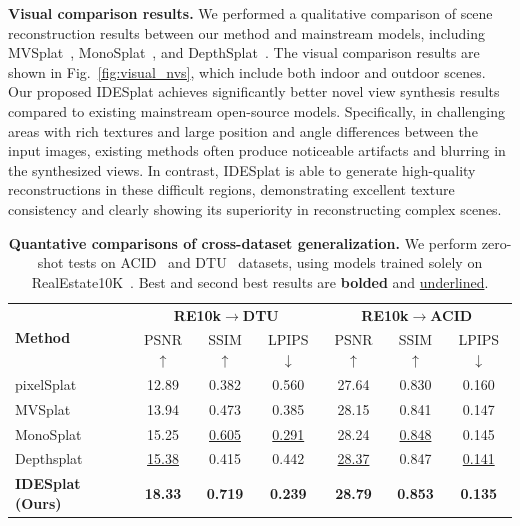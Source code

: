 %
\noindent\textbf{Visual comparison results.}
%
We performed a qualitative comparison of scene reconstruction results between our method and mainstream models, including MVSplat~\cite{chen2024mvsplat}, MonoSplat~\cite{liu2025monosplat}, and DepthSplat~\cite{xu2025depthsplat}. The visual comparison results are shown in Fig.~\ref{fig:visual_nvs}, which include both indoor and outdoor scenes.
Our proposed IDESplat achieves significantly better novel view synthesis results compared to existing mainstream open-source models.
Specifically, in challenging areas with rich textures and large position and angle differences between the input images, existing methods often produce noticeable artifacts and blurring in the synthesized views.
In contrast, IDESplat is able to generate high-quality reconstructions in these difficult regions, demonstrating excellent texture consistency and clearly showing its superiority in reconstructing complex scenes.



\begin{table}
    \footnotesize
    \centering
    \caption{\textbf{Quantative comparisons of cross-dataset generalization.} We perform zero-shot tests on ACID~\cite{liu2021infinite} and DTU~\cite{jensen2014large} datasets, using models trained solely on RealEstate10K~\cite{DBLP:journals/tog/ZhouTFFS18}. Best and second best results are \textbf{bolded} and \underline{underlined}.}
    \vspace{-2mm}
    \setlength{\tabcolsep}{2.5pt} %
    \begin{tabular}{l|ccc|ccc}
        \toprule
        \multirow{2}{*}{\textbf{Method}} & \multicolumn{3}{c|}{\textbf{RE10k$\rightarrow$DTU}} & \multicolumn{3}{c}{\textbf{RE10k$\rightarrow$ACID}}\\
        & PSNR$\uparrow$ & SSIM$\uparrow$ & LPIPS$\downarrow$  & PSNR$\uparrow$ & SSIM$\uparrow$ & LPIPS$\downarrow$ \\
        \midrule
        pixelSplat~\cite{charatan2024pixelsplat} & 12.89             & 0.382             & 0.560 & 27.64 & 0.830 & 0.160 \\
        MVSplat~\cite{chen2024mvsplat}           & 13.94             & 0.473             & 0.385 & 28.15 & 0.841 & 0.147 \\
        MonoSplat~\cite{liu2025monosplat}        & 15.25             & \underline{0.605} & \underline{0.291} & 28.24 & \underline{0.848} & 0.145 \\
        Depthsplat~\cite{xu2025depthsplat}       & \underline{15.38} & 0.415             & 0.442 & \underline{28.37} & 0.847 & \underline{0.141} \\
        \rowcolor{row_color}
        \textbf{IDESplat (Ours)}                 & \textbf{18.33}    & \textbf{0.719}    & \textbf{0.239} & \textbf{28.79} & \textbf{0.853} & \textbf{0.135} \\
        \bottomrule
    \end{tabular}
    \label{tab:cross_dataset}
\vspace{-6mm}
\end{table}


